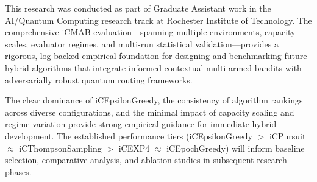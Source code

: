\documentclass[12pt,a4paper]{article}
\begin{document}
This research was conducted as part of Graduate Assistant work in the AI/Quantum Computing research track at Rochester Institute of Technology. The comprehensive iCMAB evaluation—spanning multiple environments, capacity scales, evaluator regimes, and multi-run statistical validation—provides a rigorous, log-backed empirical foundation for designing and benchmarking future hybrid algorithms that integrate informed contextual multi-armed bandits with adversarially robust quantum routing frameworks.

The clear dominance of iCEpsilonGreedy, the consistency of algorithm rankings across diverse configurations, and the minimal impact of capacity scaling and regime variation provide strong empirical guidance for immediate hybrid development. The established performance tiers (iCEpsilonGreedy $>$ iCPursuit $\approx$ iCThompsonSampling $>$ iCEXP4 $\approx$ iCEpochGreedy) will inform baseline selection, comparative analysis, and ablation studies in subsequent research phases.
\end{document}
